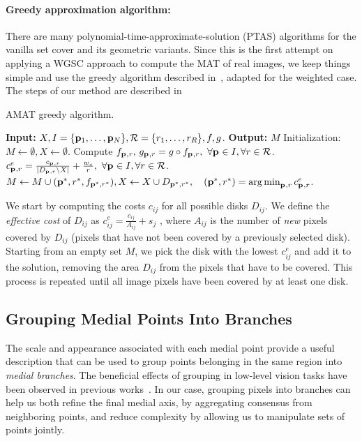 \documentclass[10pt,twocolumn,letterpaper]{article}
\begin{document}
\paragraph{Greedy approximation algorithm:}
There are many polynomial-time-approximate-solution (PTAS) algorithms for the vanilla set cover
and its geometric variants.
Since this is the first attempt on applying a WGSC approach to compute the MAT of real images, we keep things simple
and use the greedy algorithm described in~\cite{vazirani2013approximation}, adapted for the weighted case.
The steps of our method are described in~
\begin{algorithm}[t]
\caption{AMAT greedy algorithm.}
\label{alg:greedy}
	\begin{algorithmic}[1]
	\Statex \textbf{Input:} $X,I=\{\mathbf{p}_{1},\ldots,\mathbf{p}_{N}\},\mathcal{R}=\{r_1,\ldots,r_R\},f,g$.
	\Statex \textbf{Output:} $M$
	\State Initialization: $M \leftarrow \emptyset,X \leftarrow \emptyset$.
	\State Compute $f_{\mathbf{p}_{},r},\, g_{\mathbf{p}_{},r} = g \circ f_{\mathbf{p}_{},r},\,\, \forall \mathbf{p}_{} \in I, \forall r \in \mathcal{R}$.
		\State $c_{\mathbf{p}_{},r}^e = \frac{c_{\mathbf{p}_{},r}}{|D_{\mathbf{p}_{},r} \setminus X|}+\frac{w_s}{r},\,\, \forall \mathbf{p}_{} \in I, \forall r \in \mathcal{R}$.		
		\State $M\leftarrow M\cup{(\p{}^{*},r^{*},f_{\p{}^{*},r^{*}})},  \newline
				X \leftarrow X\cup D_{\p{}^{*},r^{*}}, \quad (\p{}^{*},r^{*}) = \argmin_{\p{},r}{c_{\p{},r}^e}$.		
	\EndWhile
	\end{algorithmic}
\end{algorithm}
We start by computing the costs $c_{ij}$ for all possible disks $D_{ij}$.
We define the \emph{effective cost} of $D_{ij}$ as $c_{ij}^e = \frac{c_{ij}}{A_{ij}} + s_j$ , where $A_{ij}$ is the number
of \emph{new} pixels covered by $D_{ij}$ (pixels that have not been covered by a previously selected disk).
Starting from an empty set $M$, we pick the disk with the lowest $c_{ij}^e$ and add it to the solution, 
removing the area $D_{ij}$ from the pixels that have to be covered.
This process is repeated until all image pixels have been covered by at least one disk.

\subsection{Grouping Medial Points Into Branches}\label{sec:method:grouping}
The scale and appearance associated with each medial point provide a useful
description that can be used to group points belonging in the same region into \emph{medial branches}.
The beneficial effects of grouping in low-level vision tasks have been
observed in previous works~\cite{felzenszwalb2006min,zhu2007untangling,kokkinos2010highly,qi2015making}.
In our case, grouping pixels into branches can help us both refine the final medial axis, 
by aggregating consensus from neighboring points, and reduce complexity 
by allowing us to manipulate sets of points jointly.
\end{document}
